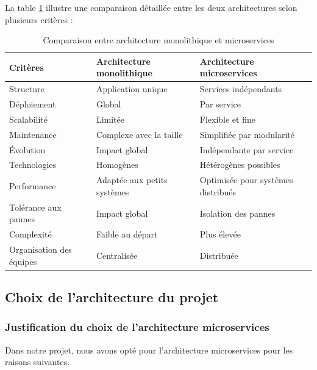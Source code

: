 La table \ref{tab:mono_micro} illustre une comparaison détaillée entre les deux architectures selon plusieurs critères :

\begin{longtable}{|p{3.5cm}|p{6cm}|p{6cm}|}
\caption{Comparaison entre architecture monolithique et microservices\cite{atlassian_comparaison_monolithe_microservices}}
\label{tab:mono_micro} \\
\hline
\rowcolor{coloranihub}
\textbf{Critères} & \textbf{Architecture monolithique} & \textbf{Architecture microservices} \\
\hline
Structure & Application unique & Services indépendants \\
\hline
Déploiement & Global & Par service \\
\hline
Scalabilité & Limitée & Flexible et fine \\
\hline
Maintenance & Complexe avec la taille & Simplifiée par modularité \\
\hline
Évolution & Impact global & Indépendante par service \\
\hline
Technologies & Homogènes & Hétérogènes possibles \\
\hline
Performance & Adaptée aux petits systèmes & Optimisée pour systèmes distribués \\
\hline
Tolérance aux pannes & Impact global & Isolation des pannes \\
\hline
Complexité & Faible au départ & Plus élevée \\
\hline
Organisation des équipes & Centralisée & Distribuée \\
\hline
\end{longtable} 
\newpage
\subsection{Choix de l’architecture du projet}
\subsubsection{Justification du choix de l’architecture microservices}

Dans notre projet, nous avons opté pour l’architecture microservices pour les raisons suivantes.

